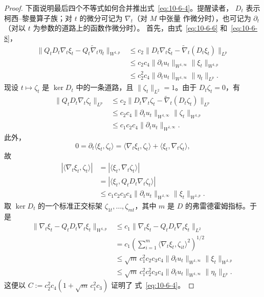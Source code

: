 \begin{proof}
下面说明最后四个不等式如何合并推出式~\eqref{eq:10-6-4}。提醒读者，
$D_t$ 表示柯西--黎曼算子族；对 $t$ 的微分可记为 $\nabla_t$（对 $M$ 中张量
作微分时），也可记为 $\partial_t$（对以 $t$ 为参数的道路上的函数作微分时）。
首先，由式~\eqref{eq:10-6-6} 和~\eqref{eq:10-6-8}，
\[
\begin{aligned}
  \|Q_tD_t\nabla_t\xi_t-Q_t\widetilde\nabla_t\eta_t\|_{W^{1,p}}
  &\le c_2\|D_t\nabla_t\xi_t
              -\widetilde\nabla_t(D_t\xi_t)\|_{L^p}\\
  &\le c_2c_4\|\partial_tu_t\|_{W^{1,\infty}}
                 \|\xi_t\|_{W^{1,p}}\\
  &\le c_2^2c_4\|\partial_tu_t\|_{W^{1,\infty}}
                  \|\eta_t\|_{L^p}.
\end{aligned}
\]
现设 $t\mapsto\zeta_t$ 是 $\ker D_t$ 中的一条道路，且
$\|\zeta_t\|_{L^2}=1$。由于 $D_t\zeta_t=0$，有
\[
\begin{aligned}
  \|Q_tD_t\nabla_t\zeta_t\|_{L^p}
  &\le c_2\|D_t\nabla_t\zeta_t
              -\widetilde\nabla_t(D_t\zeta_t)\|_{L^p}\\
  &\le c_2c_4\|\partial_tu_t\|_{W^{1,\infty}}
                 \|\zeta_t\|_{W^{1,p}}\\
  &\le c_1c_2c_4\|\partial_tu_t\|_{W^{1,\infty}}.
\end{aligned}
\]
此外，
\[
  0=\partial_t\langle\xi_t,\zeta_t\rangle
   =\langle\nabla_t\xi_t,\zeta_t\rangle
    +\langle\xi_t,\nabla_t\zeta_t\rangle,
\]
故
\[
\begin{aligned}
  |\langle\nabla_t\xi_t,\zeta_t\rangle|
  &=|\langle\xi_t,\nabla_t\zeta_t\rangle|\\
  &=|\langle\xi_t,Q_tD_t\nabla_t\zeta_t\rangle|\\
  &\le c_1c_2c_3c_4
       \|\partial_tu_t\|_{W^{1,\infty}}\|\xi_t\|_{W^{1,p}}.
\end{aligned}
\]
取 $\ker D_t$ 的一个标准正交标架
$\zeta_{1t},\ldots,\zeta_{mt}$，其中 $m$ 是 $D$ 的弗雷德霍姆指标。于是
\[
\begin{aligned}
  \|\nabla_t\xi_t-Q_tD_t\nabla_t\xi_t\|_{W^{1,p}}
  &\le c_1\|\nabla_t\xi_t-Q_tD_t\nabla_t\xi_t\|_{L^2}\\
  &=c_1\left(
     \sum_{i=1}^m\langle\nabla_t\xi_t,\zeta_{it}\rangle^2
     \right)^{1/2}\\
  &\le\sqrt m\,c_1^2c_2c_3c_4
       \|\partial_tu_t\|_{W^{1,\infty}}\|\xi_t\|_{W^{1,p}}\\
  &\le\sqrt m\,c_1^2c_2^2c_3c_4
       \|\partial_tu_t\|_{W^{1,\infty}}\|\eta_t\|_{L^p}.
\end{aligned}
\]
这便以 $C:=c_2^2c_4(1+\sqrt m\,c_1^2c_3)$ 证明了
式~\eqref{eq:10-6-4}。


\end{proof}
